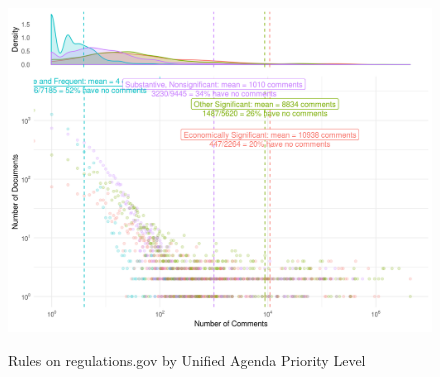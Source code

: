 \documentclass[
      12pt,
        ]{article}
\begin{document}
\begin{figure}[p!]
    \centering
        \caption{Rules on regulations.gov by Unified Agenda Priority Level}
    \includegraphics[width = 7in]{../Figs/priority-comment-density-1.png}
    \label{fig:rules-priority}
\end{figure}

\clearpage
\end{document}
